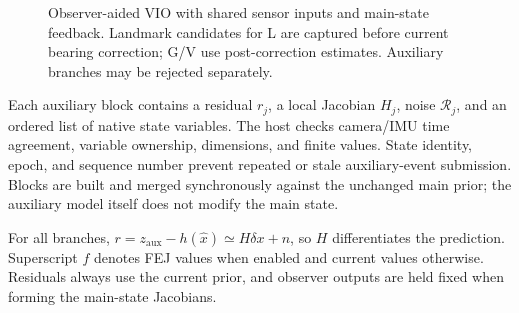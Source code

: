 \documentclass[a4paper,runningheads,twocolumn]{llncs}
\begin{document}
\begin{figure}[t]
\centering
{}
\caption{Observer-aided VIO with shared sensor inputs and main-state feedback. Landmark candidates for L are captured before current bearing correction; G/V use post-correction estimates. Auxiliary branches may be rejected separately.}
\label{fig:framework}
\end{figure}

Each auxiliary block contains a residual $r_j$, a local Jacobian $H_j$, noise $\mathcal R_j$, and an ordered list of native state variables. The host checks camera/IMU time agreement, variable ownership, dimensions, and finite values. State identity, epoch, and sequence number prevent repeated or stale auxiliary-event submission. Blocks are built and merged synchronously against the unchanged main prior; the auxiliary model itself does not modify the main state.

For all branches, $r=z_{\mathrm{aux}}-h(\hat x)\simeq H\delta x+n$, so $H$ differentiates the prediction. Superscript $f$ denotes FEJ values when enabled and current values otherwise. Residuals always use the current prior, and observer outputs are held fixed when forming the main-state Jacobians.
\end{document}
